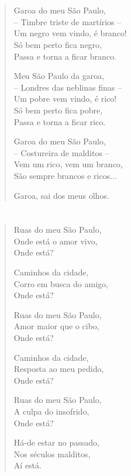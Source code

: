 \chapter*{}

\begin{verse}
Garoa do meu São Paulo,\\
-- Timbre triste de martírios --\\
Um negro vem vindo, é branco!\\
Só bem perto fica negro,\\
Passa e torna a ficar branco.

Meu São Paulo da garoa,\\
-- Londres das neblinas finas --\\
Um pobre vem vindo, é rico!\\
Só bem perto fica pobre,\\
Passa e torna a ficar rico.

Garoa do meu São Paulo,\\
-- Costureira de malditos --\\
Vem um rico, vem um branco,\\
São sempre brancos e ricos...

Garoa, sai dos meus olhos.
\end{verse}

\chapter*{}

\begin{verse}
Ruas do meu São Paulo,\\
Onde está o amor vivo,\\
Onde está?

Caminhos da cidade,\\
Corro em busca do amigo,\\
Onde está?

Ruas do meu São Paulo,\\
Amor maior que o cibo,\\
Onde está?

Caminhos da cidade,\\
Resposta ao meu pedido,\\
Onde está?

Ruas do meu São Paulo,\\
A culpa do insofrido,\\
Onde está?

Há-de estar no passado,\\
Nos séculos malditos,\\
Aí está.
\end{verse}

